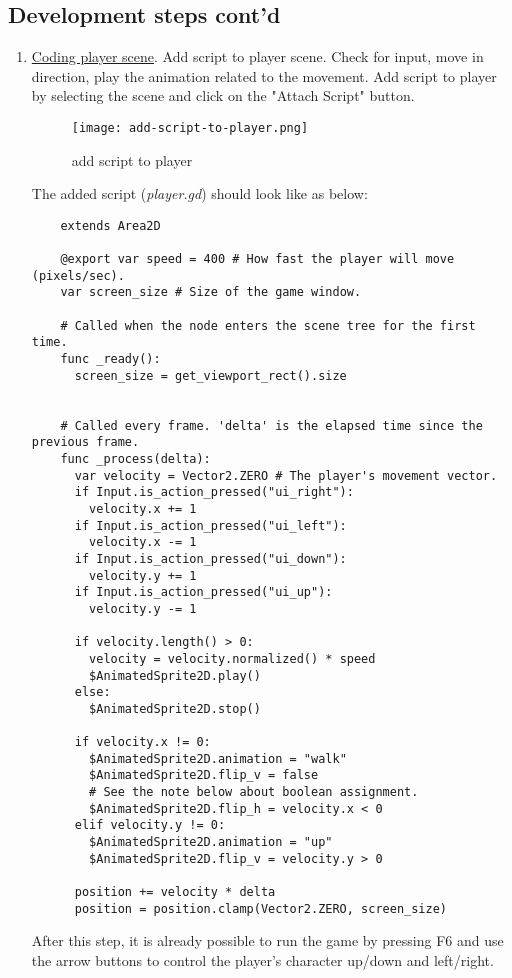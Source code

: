 \subsection{Development steps cont'd}
\begin{enumerate}[resume]
  \item \href{https://docs.godotengine.org/en/stable/getting_started/first_2d_game/03.coding_the_player.html}{\color{blue}Coding player scene}. 
  Add script to player scene. Check for input, move in direction, play the animation related
  to the movement.
  Add script to player by selecting the scene and click on the "Attach Script" button.
  \begin{figure}[H]
    \centering
    \texttt{[image: add-script-to-player.png]}
      \caption{add script to player}
      \label{fig:add-script-to-player}
  \end{figure}
  The added script (\textit{player.gd}) should look like as below:
  \begin{verbatim}
    extends Area2D

    @export var speed = 400 # How fast the player will move (pixels/sec).
    var screen_size # Size of the game window.
    
    # Called when the node enters the scene tree for the first time.
    func _ready():
      screen_size = get_viewport_rect().size
    
    
    # Called every frame. 'delta' is the elapsed time since the previous frame.
    func _process(delta):
      var velocity = Vector2.ZERO # The player's movement vector.
      if Input.is_action_pressed("ui_right"):
        velocity.x += 1
      if Input.is_action_pressed("ui_left"):
        velocity.x -= 1
      if Input.is_action_pressed("ui_down"):
        velocity.y += 1
      if Input.is_action_pressed("ui_up"):
        velocity.y -= 1
    
      if velocity.length() > 0:
        velocity = velocity.normalized() * speed
        $AnimatedSprite2D.play()
      else:
        $AnimatedSprite2D.stop()
      
      if velocity.x != 0:
        $AnimatedSprite2D.animation = "walk"
        $AnimatedSprite2D.flip_v = false
        # See the note below about boolean assignment.
        $AnimatedSprite2D.flip_h = velocity.x < 0
      elif velocity.y != 0:
        $AnimatedSprite2D.animation = "up"
        $AnimatedSprite2D.flip_v = velocity.y > 0
      
      position += velocity * delta
      position = position.clamp(Vector2.ZERO, screen_size)    

  \end{verbatim} 
  After this step, it is already possible to run the game by pressing F6 and use the arrow buttons to control the player's
  character up/down and left/right.
\end{enumerate}